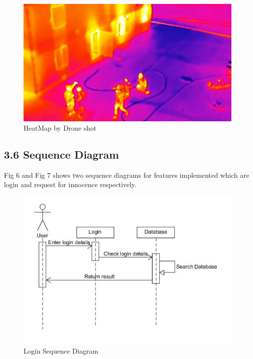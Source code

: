 \documentclass[eng]{FCEFyN-class}
\begin{document}
\begin{enumerate}
    \begin{figure}[!htb]
        \centering
        \includegraphics[scale =0.4]{filesFCEFyN-class/infra.jpg}
        \caption{HeatMap by Drone shot}
        \label{fig:my_label}
        \FloatBarrier
    \end{figure}
\end{enumerate}
\subsection{3.6 Sequence Diagram}
Fig 6 and Fig 7 shows two sequence diagrams for features implemented which are login and request for innocence respectively.
\vspace{1.3cm}
\begin{figure}[!htb]
 \includegraphics[scale=0.4]{filesFCEFyN-class/login_sd.jpg} 
 \caption{Login Sequence Diagram} \label{fig-2}
 \FloatBarrier
\end{figure}
\end{document}
